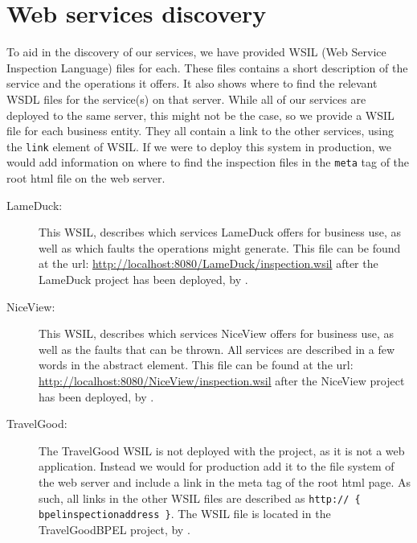 \chapter{Web services discovery}
\mrb

\noindent
To aid in the discovery of our services, we have provided WSIL (Web Service Inspection Language) files for each. These files contains a short description of the service and the operations it offers. It also shows where to find the relevant WSDL files for the service(s) on that server. While all of our services are deployed to the same server, this might not be the case, so we provide a WSIL file for each business entity. They all contain a link to the other services, using the \texttt{link} element of WSIL. If we were to deploy this system in production, we would add information on where to find the inspection files in the \texttt{meta} tag of the root html file on the web server.

\begin{description}
\item [LameDuck:] This WSIL, describes which services LameDuck offers for business use, as well as which faults the operations might generate. This file can be found at the url: \url{http://localhost:8080/LameDuck/inspection.wsil} after the LameDuck project has been deployed, by \kim{}.

\item [NiceView:] This WSIL, describes which services NiceView offers for business use, as well as the faults that can be thrown. All services are described in a few words in the abstract element. This file can be found at the url: \url{http://localhost:8080/NiceView/inspection.wsil} after the NiceView project has been deployed, by \mkt{}.

\item [TravelGood:] The TravelGood WSIL is not deployed with the project, as it is not a web application. Instead we would for production add it to the file system of the web server and include a link in the meta tag of the root html page. As such, all links in the other WSIL files are described as \texttt{http:// \{ bpelinspectionaddress \}}. The WSIL file is located in the TravelGoodBPEL project, by \pet{}.


\end{description}

